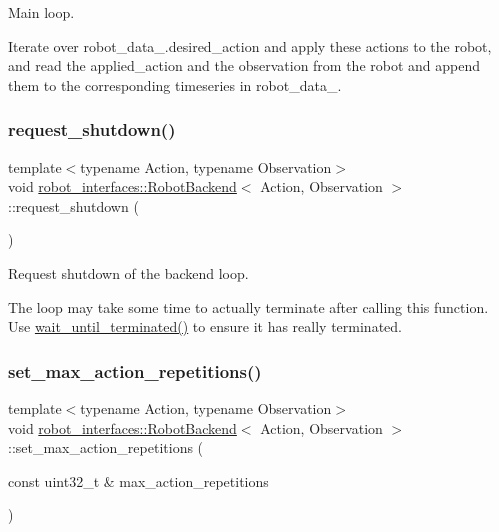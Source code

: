 Main loop. 

Iterate over robot\+\_\+data\+\_\+.\+desired\+\_\+action and apply these actions to the robot, and read the applied\+\_\+action and the observation from the robot and append them to the corresponding timeseries in robot\+\_\+data\+\_\+. \mbox{\label{classrobot__interfaces_1_1RobotBackend_a3da1748227b56acf7b745aff64023715}} 
\subsubsection{\texorpdfstring{request\+\_\+shutdown()}{request\_shutdown()}}
{\footnotesize\ttfamily template$<$typename Action, typename Observation$>$ \\
void \hyperlink{classrobot__interfaces_1_1RobotBackend}{robot\+\_\+interfaces\+::\+Robot\+Backend}$<$ Action, Observation $>$\+::request\+\_\+shutdown (\begin{DoxyParamCaption}{ }\end{DoxyParamCaption})\hspace{0.3cm}{\ttfamily [inline]}}



Request shutdown of the backend loop. 

The loop may take some time to actually terminate after calling this function. Use \hyperlink{classrobot__interfaces_1_1RobotBackend_ad4e9c9fda8d3bbab60b1896df1e1e78b}{wait\+\_\+until\+\_\+terminated()} to ensure it has really terminated. \mbox{\label{classrobot__interfaces_1_1RobotBackend_aad761d1e0ab7296a9632b9c4cc9c91db}} 
\subsubsection{\texorpdfstring{set\+\_\+max\+\_\+action\+\_\+repetitions()}{set\_max\_action\_repetitions()}}
{\footnotesize\ttfamily template$<$typename Action, typename Observation$>$ \\
void \hyperlink{classrobot__interfaces_1_1RobotBackend}{robot\+\_\+interfaces\+::\+Robot\+Backend}$<$ Action, Observation $>$\+::set\+\_\+max\+\_\+action\+\_\+repetitions (\begin{DoxyParamCaption}\item[{const uint32\+\_\+t \&}]{max\+\_\+action\+\_\+repetitions }\end{DoxyParamCaption})\hspace{0.3cm}{\ttfamily [inline]}}



